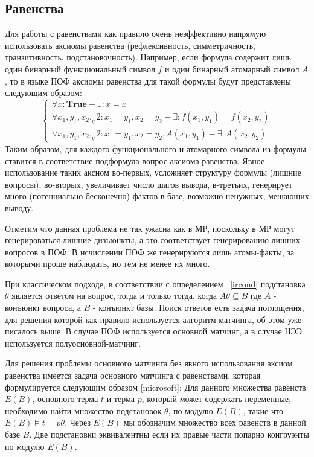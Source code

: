 \subsection{Равенства}
Для работы с равенствами как правило очень неэффективно напрямую использовать аксиомы равенства (рефлексивность, симметричность, транзитивность, подстановочность). Например, если формула содержит лишь один бинарный функциональный символ $f$ и один бинарный атомарный символ $A$, то в языке ПОФ аксиомы равенства для такой формулы будут представлены следующим образом: 
$$\left\lbrace
\begin{array}{l}
\forall x\colon\boldsymbol{True} - \exists\colon x = x \\
\forall x_1,y_1,x_2,_y2\colon x_1 = y_1, x_2 = y_2 - \exists\colon f(x_1,y_1) = f(x_2, y_2) \\
\forall x_1,y_1,x_2,_y2\colon x_1 = y_1, x_2 = y_2, A(x_1,y_1) - \exists\colon A(x_2,y_2)
\end{array}\right.
$$
Таким образом, для каждого функционального и атомарного символа из формулы ставится в соответствие подформула-вопрос аксиома равенства. Явное использование таких аксиом во-первых, усложняет структуру формулы (лишние вопросы), во-вторых, увеличивает число шагов вывода, в-третьих, генерирует много (потенциально бесконечно) фактов в базе, возможно ненужных, мешающих выводу. 

Отметим что данная проблема не так ужасна как в МР, поскольку в МР могут генерироваться лишние дизъюнкты, а это соответствует генерированию лишних вопросов в ПОФ. В исчислении ПОФ же генерируются лишь атомы-факты, за которыми проще наблюдать, но тем не менее их много.

При классическом подходе, в соответствии с определением ~\ref{ircond} подстановка $\theta$ является ответом на вопрос, тогда и только тогда, когда $A \theta \subseteq B$ где $A$ - конъюнкт вопроса, а $B$ - конъюнкт базы. Поиск ответов есть задача поглощения, для решения которой как правило используется алгоритм матчинга, об этом уже писалось выше. В случае ПОФ используется основной матчинг, а в случае НЭЭ используется полуосновной-матчинг.
 
Для решения проблемы основного матчинга без явного использования аксиом равенства имеется задача основного матчинга с равенствами, которая формулируется следующим образом [microsoft]:
Для данного множества равенств $E(B)$, основного терма $t$ и терма $p$, который может содержать переменные, необходимо найти множество подстановок $\theta$, по модулю $E(B)$, такие что $E(B)\models t = p\theta$. Через $E(B)$ мы обозначим множество всех равенств в данной базе $B$. Две подстановки эквивалентны если их правые части попарно конгруэнты по модулю $E(B)$.

